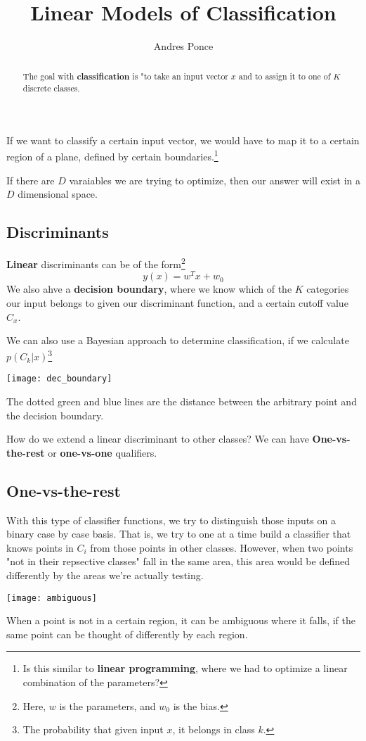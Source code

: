 \documentclass{tufte-handout}
\title{Linear Models of Classification}
\author{Andres Ponce}
\begin{document}
\maketitle
\begin{abstract}
	The goal with \textbf{classification} is "to take 
	an input vector $x$ and to assign it to one of $K$
	discrete classes.
\end{abstract}

If we want to classify a certain input vector, we would have 
to map it to a certain region of a plane, defined by certain 
boundaries.\footnote{Is this similar to \textbf{linear programming},
where we had to optimize a linear combination of the parameters?}

If there are $D$ varaiables we are trying to optimize, then our 
answer will exist in a $D$ dimensional space. 
\subsection{Discriminants}
\textbf{Linear} discriminants can be of the form\footnote{Here, 
$w$ is the parameters, and $w_{0}$ is the bias.}
\[ y(x) = w^{T}x + w_{0}\]
We also ahve a \textbf{decision boundary}, where we know which of the
$K$ categories our input belongs to given our discriminant function,
and a certain cutoff value $C_{x}$.

We can also use a Bayesian approach to determine classification, if we 
calculate $p(C_{k}|x)$\footnote{The probability that given input $x$, 
it belongs in class $k$.}
\begin{marginfigure}
	\texttt{[image: dec\_boundary]}
	\caption{The dotted green and blue lines are the 
		distance between the arbitrary point and the 
		decision boundary.}
\end{marginfigure}

How do we extend a linear discriminant to other classes? We can have
\textbf{One-vs-the-rest} or \textbf{one-vs-one} qualifiers.
\subsection{One-vs-the-rest}
	With this type of classifier functions, we try to distinguish those
	inputs on a binary case by case basis. That is, we try to one at a time
	build a classifier that knows points in $C_{i}$ from those points in other
	classes. However, when two points  "not in their repsective classes" fall
	in the same area, this area would be defined differently by the areas we're 
	actually testing.
	\begin{marginfigure}
		\texttt{[image: ambiguous]}
		\caption{When a point is not in a certain region, it can 
			be ambiguous where it falls, if the same point can be thought
			of differently by each region.}
	\end{marginfigure}
\end{document}
